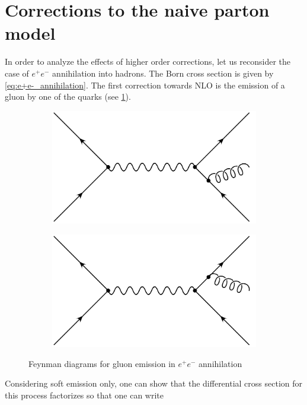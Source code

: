 \section{Corrections to the naive parton model}
In order to analyze the effects of higher order corrections, let us reconsider the case of $e^+ e^-$ annihilation into hadrons.
The Born cross section is given by \cref{eq:e+e-_annihilation}.
The first correction towards NLO is the emission of a gluon by one of the quarks (see \cref{fig:e+e-_real}).
%
\begin{figure}
\centering
	\begin{subfigure}[]{0.45\textwidth}
		\includegraphics[width=\textwidth]{images/e+e-_real1.pdf}
	\end{subfigure}
	\hspace{1cm}
	\begin{subfigure}[]{0.45\textwidth}
		\includegraphics[width=\textwidth]{images/e+e-_real2.pdf}
	\end{subfigure}
	\caption{Feynman diagrams for gluon emission in $e^+ e^-$ annihilation}
	\label{fig:e+e-_real}
\end{figure}
%
Considering soft emission only, one can show that the differential cross section for this process factorizes so that one can write
